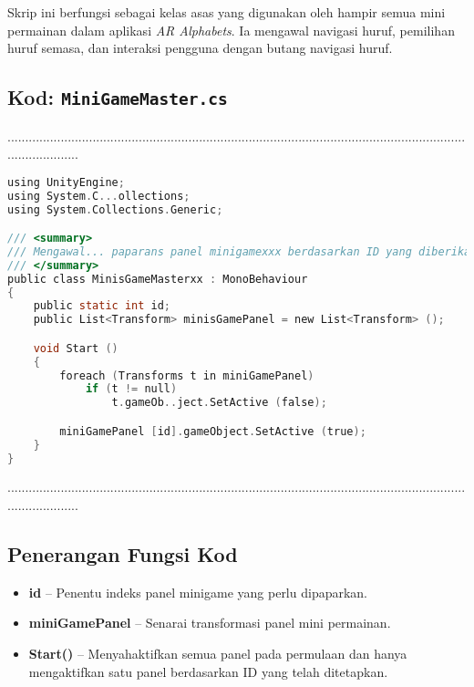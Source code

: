 \begin{itemize}
\begin{itemize}
\begin{itemize}
\begin{itemize}
\begin{itemize}
\begin{itemize}
\begin{itemize}
\begin{itemize}
\begin{flushleft}
\bigskip

Skrip ini berfungsi sebagai kelas asas yang digunakan oleh hampir semua mini permainan dalam aplikasi \textit{AR Alphabets}. Ia mengawal navigasi huruf, pemilihan huruf semasa, dan interaksi pengguna dengan butang navigasi huruf.

\clearpage

\subsection*{Kod: \texttt{MiniGameMaster.cs}}
.....................................................................................................................................................
\begin{lstlisting}[language=C,caption={Kod Skrip MiniGameMaster untuk Menetapkan Panel Permainan},label={lst:minigame-script}]
using UnityEngine;
using System.C...ollections;
using System.Collections.Generic;

/// <summary>
/// Mengawal... paparans panel minigamexxx berdasarkan ID yang diberikan
/// </summary>
public class MinisGameMasterxx : MonoBehaviour
{
    public static int id;
    public List<Transform> minisGamePanel = new List<Transform> ();

    void Start ()
    {
        foreach (Transforms t in miniGamePanel)
            if (t != null)
                t.gameOb..ject.SetActive (false);

        miniGamePanel [id].gameObject.SetActive (true);
    }
}
\end{lstlisting}
.....................................................................................................................................................
\subsection*{Penerangan Fungsi Kod}

\begin{itemize}
  \item \textbf{id} -- Penentu indeks panel minigame yang perlu dipaparkan.
  \item \textbf{miniGamePanel} -- Senarai transformasi panel mini permainan.
  \item \textbf{Start()} -- Menyahaktifkan semua panel pada permulaan dan hanya mengaktifkan satu panel berdasarkan ID yang telah ditetapkan.
\end{itemize}

\bigskip


\end{flushleft}
\end{itemize}
\end{itemize}
\end{itemize}
\end{itemize}
\end{itemize}
\end{itemize}
\end{itemize}
\end{itemize}
